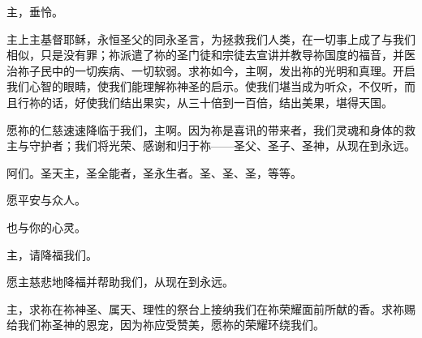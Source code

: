 \par

主，垂怜。\par

\par

主上主基督耶稣，永恒圣父的同永圣言，为拯救我们人类，在一切事上成了与我们相似，只是没有罪；祢派遣了祢的圣门徒和宗徒去宣讲并教导祢国度的福音，并医治祢子民中的一切疾病、一切软弱。求祢如今，主啊，发出祢的光明和真理。开启我们心智的眼睛，使我们能理解祢神圣的启示。使我们堪当成为听众，不仅听，而且行祢的话，好使我们结出果实，从三十倍到一百倍，结出美果，堪得天国。\par

\par

愿祢的仁慈速速降临于我们，主啊。因为祢是喜讯的带来者，我们灵魂和身体的救主与守护者；我们将光荣、感谢和归于祢——圣父、圣子、圣神，从现在到永远。\par

\par

阿们。圣天主，圣全能者，圣永生者。圣、圣、圣，等等。\par

\par

愿平安与众人。\par

\par

也与你的心灵。\par

\par

主，请降福我们。\par

\par

愿主慈悲地降福并帮助我们，从现在到永远。\par

\par

主，求祢在祢神圣、属天、理性的祭台上接纳我们在祢荣耀面前所献的香。求祢赐给我们祢圣神的恩宠，因为祢应受赞美，愿祢的荣耀环绕我们。\par

